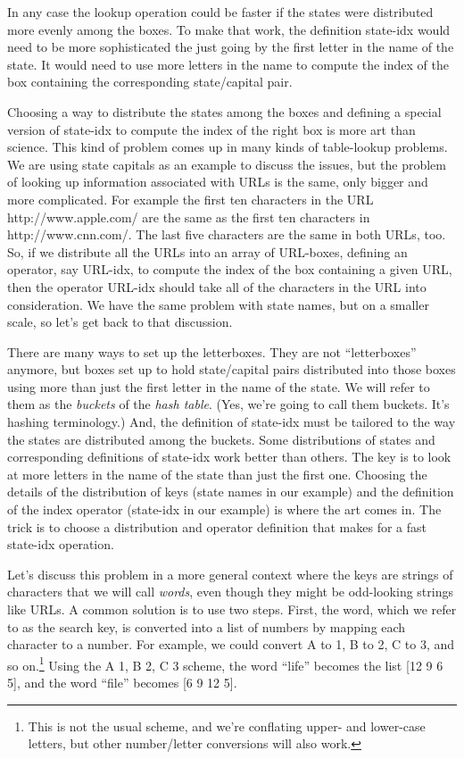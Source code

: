 In any case the \textsf{lookup} operation could be faster
if the states were distributed more evenly among the boxes.
To make that work, the definition
\textsf{state-idx} would need to be more sophisticated
the just going by the first letter in the name of the state.
It would need to use more letters in the name
to compute the index of the box containing the corresponding
state/capital pair.

Choosing a way to distribute the states among the boxes
and defining a special version of \textsf{state-idx}
to compute the index of the right box is
more art than science. This kind of problem comes up in
many kinds of table-lookup problems. We are using
state capitals as an example to discuss the issues,
but the problem of looking up information associated
with URLs is the same, only bigger and more complicated.
For example the first ten characters in the URL
http://www.apple.com/ are the same as the first ten
characters in http://www.cnn.com/. The last five
characters are the same in both URLs, too.
So, if we distribute all the URLs into an array of URL-boxes,
defining an operator, say \textsf{URL-idx}, to compute the
index of the box containing a given URL,
then the operator \textsf{URL-idx} should take
all of the characters in the URL into consideration.
We have the same problem with state names, but on a
smaller scale, so let's get back to that discussion.

There are many ways to set up the letterboxes.
They are not ``letterboxes'' anymore, but boxes set up to hold
state/capital pairs distributed into those boxes using
more than just the first letter in the name of the state.
We will refer to them as the
\emph{buckets}
of the \emph{hash table}.
(Yes, we're going to call them buckets. It's hashing terminology.)
And, the definition of \textsf{state-idx} must be
tailored to the way the states are distributed among the buckets.
Some distributions of states and corresponding definitions
of \textsf{state-idx} work better than others.
The key is to look at more letters in the name of the state
than just the first one.
Choosing the details of the distribution of keys
(state names in our example) and the definition of the index operator
(\textsf{state-idx} in our example) is where the art comes in.
The trick is to choose a distribution and operator
definition that makes for a fast \textsf{state-idx} operation.

Let's discuss this problem in a more general context
where the keys are strings of characters that we will
call \emph{words}, even though they might be odd-looking
strings like URLs.
A common solution is to use two steps. First, the word,
which we refer to as the search key, is converted
into a list of numbers by mapping each character to a number. For
example, we could convert A to 1, B to 2, C to 3,
and so on.\footnote{This is not the usual scheme,
and we're conflating upper- and
lower-case letters, but other number/letter conversions  will also work.}
Using the A 1, B 2, C 3 scheme, the word ``life'' becomes the list
\textsf{[12 9 6 5]},
and the word ``file'' becomes \textsf{[6 9 12 5]}.

